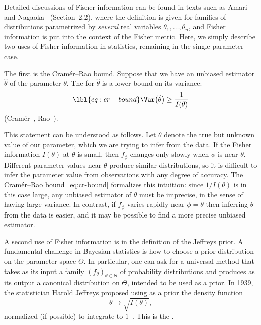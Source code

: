 Detailed discussions of Fisher information can be found in texts such as
Amari and Nagaoka~\cite{AmNa} (Section~2.2), where the definition is given
for families of distributions parametrized by \emph{several} real variables
$\theta_1, \ldots, \theta_n$, and Fisher information is put into the
context of the Fisher metric.  Here, we simply describe two uses of Fisher
information in statistics, remaining in the single-parameter
case.

The first is the Cram\'er--Rao%
%
%
%
bound.  Suppose that we have an unbiased estimator $\hat{\theta}$ of the
parameter $\theta$.  The  for $\hat{\theta}$ is
a lower bound on its variance:
% 
\begin{equation}
\lbl{eq:cr-bound}
\Var\bigl(\hat{\theta}\bigr) \geq \frac{1}{I(\theta)}
\end{equation}
% 
(Cram\'er~\cite{Cram}, Rao~\cite{RaoIAA}).

This statement can be understood as follows.  Let $\theta$ denote the true
but unknown value of our parameter, which we are trying to infer from the
data.  If the Fisher information $I(\theta)$ at $\theta$ is small, then
$f_\phi$ changes only slowly when $\phi$ is near $\theta$.  Different
parameter values near $\theta$ produce similar distributions, so it is
difficult to infer the parameter value from observations with any degree of
accuracy.  The Cram\'er--Rao bound~\eqref{eq:cr-bound} formalizes this
intuition: since $1/I(\theta)$ is in this case large, any unbiased
estimator of $\theta$ must be imprecise, in the sense of having large
variance.  In contrast, if $f_\phi$ varies rapidly near $\phi = \theta$
then inferring $\theta$ from the data is easier, and it
may be possible to find a more precise unbiased estimator.

A second use of Fisher information is in the definition of the Jeffreys
prior.  A fundamental challenge in Bayesian statistics is how
to choose a prior distribution on the parameter space $\Theta$.  In
particular, one can ask for a universal method that takes as its input a
family $(f_\theta)_{\theta \in \Theta}$ of probability distributions and
produces as its output a canonical distribution on
$\Theta$, intended to be used as a prior.  In 1939, the
statistician Harold%
%
% 
Jeffreys proposed using as a prior the density function
\[
\theta \mapsto \sqrt{I(\theta)},
\]
normalized (if possible) to integrate to $1$~\cite{JeffTP,JeffIFP}.  This is
the .

